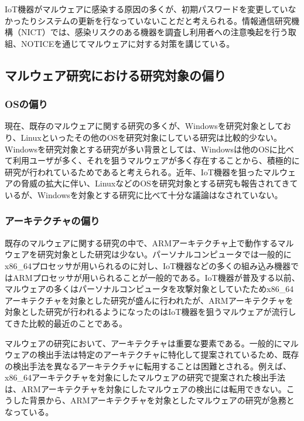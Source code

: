 \documentclass[12pt,a4paper,titlepage,report]{jsbook}
\begin{document}
IoT機器がマルウェアに感染する原因の多くが、初期パスワードを変更していなかったりシステムの更新を行なっていないことだと考えられる。情報通信研究機構（NICT）では、感染リスクのある機器を調査し利用者への注意喚起を行う取組、NOTICE\cite{notice}を通じてマルウェアに対する対策を講じている。


\subsection{マルウェア研究における研究対象の偏り}
\subsubsection{OSの偏り}
現在、既存のマルウェアに関する研究の多くが、Windowsを研究対象としており、Linuxといったその他のOSを研究対象にしている研究は比較的少ない\cite{malwaresurvey}。Windowsを研究対象とする研究が多い背景としては、Windowsは他のOSに比べて利用ユーザが多く、それを狙うマルウェアが多く存在することから、積極的に研究が行われているためであると考えられる。近年、IoT機器を狙ったマルウェアの脅威の拡大に伴い、LinuxなどのOSを研究対象とする研究も報告されてきているが、Windowsを対象とする研究に比べて十分な議論はなされていない。

\subsubsection{アーキテクチャの偏り}
既存のマルウェアに関する研究の中で、ARMアーキテクチャ上で動作するマルウェアを研究対象とした研究は少ない。パーソナルコンピュータでは一般的にx86\_64プロセッサが用いられるのに対し、IoT機器などの多くの組み込み機器ではARMプロセッサが用いられることが一般的である\cite{malwaresurvey}。IoT機器が普及する以前、マルウェアの多くはパーソナルコンピュータを攻撃対象としていたためx86\_64アーキテクチャを対象とした研究が盛んに行われたが、ARMアーキテクチャを対象とした研究が行われるようになったのはIoT機器を狙うマルウェアが流行してきた比較的最近のことである\cite{malwaresurvey}。

マルウェアの研究において、アーキテクチャは重要な要素である。一般的にマルウェアの検出手法は特定のアーキテクチャに特化して提案されているため、既存の検出手法を異なるアーキテクチャに転用することは困難とされる。例えば、x86\_64アーキテクチャを対象にしたマルウェアの研究で提案された検出手法は、ARMアーキテクチャを対象にしたマルウェアの検出には転用できない。こうした背景から、ARMアーキテクチャを対象としたマルウェアの研究が急務となっている。
\end{document}
